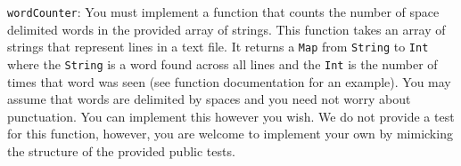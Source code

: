 \documentclass[12pt,a4paper]{exam}
\begin{document}
\begin{questions}
\question
\verb!wordCounter!: 
You must implement a function that counts the number of space delimited words in the provided array of 
strings. This function takes an array of strings that represent lines in a text file. 
It returns a \verb!Map! from \verb!String! to \verb!Int! where the \verb!String! 
is a word found across all lines and the \verb!Int! is the number of times that word was seen 
(see function documentation for an example). 
You may assume that words are delimited by spaces and you need not worry about punctuation. 
You can implement this however you wish. We do not provide a test for this function, however, 
you are welcome to implement your own by mimicking the structure of the provided public tests. 
\end{questions}
\end{document}

